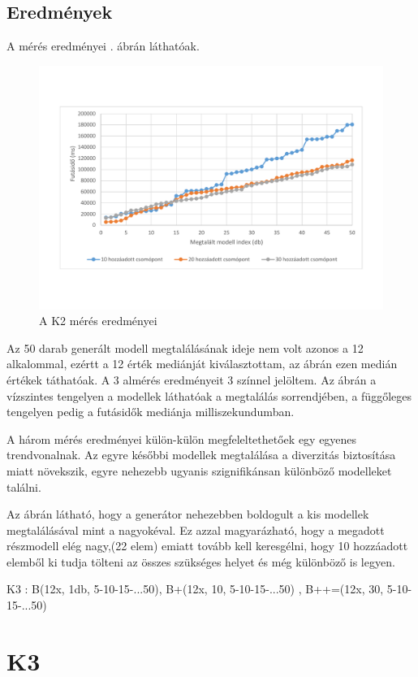 \subsection{Eredmények}
A mérés eredményei . ábrán láthatóak.


\begin{figure}
	\centering
	\includegraphics[width=1\textwidth]{figures/AmeresEredmeny}
	\caption{A K2 mérés eredményei}
	\label{fig:AmeresEredmeny}
\end{figure}

Az 50 darab generált modell megtalálásának ideje nem volt azonos a 12 alkalommal, ezértt a 12 érték mediánját kiválasztottam, az ábrán ezen medián értékek táthatóak. A 3 almérés eredményeit 3 színnel jelöltem. Az ábrán a vízszintes tengelyen a modellek láthatóak a megtalálás sorrendjében, a függőleges tengelyen pedig a futásidők mediánja milliszekundumban. 

A  három mérés eredményei külön-külön megfeleltethetőek egy egyenes trendvonalnak. Az egyre későbbi modellek megtalálása a diverzitás biztosítása miatt növekszik, egyre nehezebb ugyanis szignifikánsan különböző modelleket találni.

Az ábrán látható, hogy a generátor nehezebben boldogult a kis modellek megtalálásával  mint a nagyokéval. Ez azzal magyarázható, hogy a megadott részmodell elég nagy,(22 elem) emiatt tovább kell keresgélni, hogy 10 hozzáadott elemből ki tudja tölteni az összes szükséges  helyet és még különböző is legyen. 


K3 : B(12x, 1db, 5-10-15-...50), B+(12x, 10, 5-10-15-...50) , B++=(12x, 30, 5-10-15-...50) 
\section{K3}
